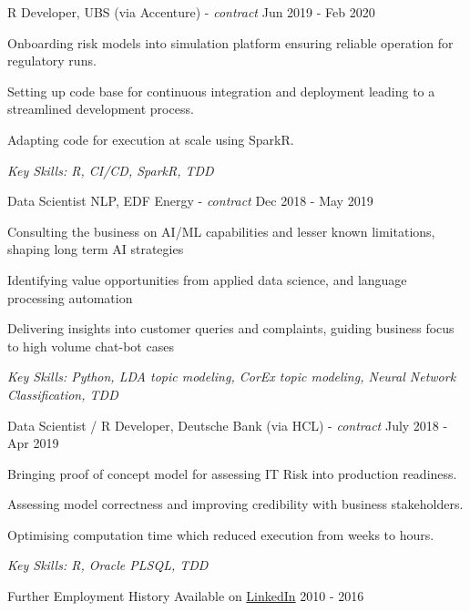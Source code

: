 \documentclass[11pt,article,oneside]{memoir}
\newenvironment{itemize*}{%
  \renewcommand\labelitemi{\textbullet}
  \footnotesize
  \begin{itemize}%
    \setlength{\itemsep}{0pt}}%
  {\end{itemize}
}
\begin{document}
\newpage

\normalsize
\medskip
\ind R Developer, UBS (via Accenture) - \emph{contract} \hfill Jun 2019 - Feb 2020
\begin{itemize*}
    \item Onboarding risk models into simulation platform ensuring reliable operation for regulatory runs.
    \item Setting up code base for continuous integration and deployment leading to a streamlined development process.
    \item Adapting code for execution at scale using SparkR.
\end{itemize*}
\ind \hspace{0.35in} \footnotesize \emph{Key Skills: R, CI/CD, SparkR, TDD}

\normalsize
\medskip
\ind Data Scientist NLP, EDF Energy - \emph{contract} \hfill Dec 2018 - May 2019
\begin{itemize*}
    \item Consulting the business on AI/ML capabilities and lesser known limitations, shaping long term AI strategies
    \item Identifying value opportunities from applied data science, and language processing automation
    \item Delivering insights into customer queries and complaints, guiding business focus to high volume chat-bot cases
\end{itemize*}
\ind \hspace{0.35in} \footnotesize \emph{Key Skills: Python, LDA topic modeling, CorEx topic modeling, Neural Network Classification, TDD }


\normalsize
\medskip
\ind Data Scientist / R Developer, Deutsche Bank (via HCL) - \emph{contract} \hfill July 2018 - Apr 2019
\begin{itemize*}
    \item Bringing proof of concept model for assessing IT Risk into production readiness.
    \item Assessing model correctness and improving credibility with business stakeholders. 
    \item Optimising computation time which reduced execution from weeks to hours.
\end{itemize*}
\ind \hspace{0.35in} \footnotesize \emph{Key Skills: R, Oracle PLSQL, TDD}

\normalsize
\medskip
\ind Further Employment History Available on \href{https://uk.linkedin.com/in/adrian-ionita-6a923129}{LinkedIn} \hfill 2010 - 2016
\end{document}
